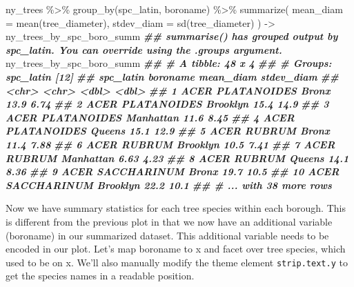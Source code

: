 \documentclass[
]{krantz}
\newenvironment{Shaded}{\begin{snugshade}}{\end{snugshade}}
\newcommand{\AttributeTok}[1]{\textcolor[rgb]{0.77,0.63,0.00}{#1}}
\newcommand{\DocumentationTok}[1]{\textcolor[rgb]{0.56,0.35,0.01}{\textbf{\textit{#1}}}}
\newcommand{\FunctionTok}[1]{\textcolor[rgb]{0.00,0.00,0.00}{#1}}
\newcommand{\NormalTok}[1]{#1}
\newcommand{\OtherTok}[1]{\textcolor[rgb]{0.56,0.35,0.01}{#1}}
\newcommand{\SpecialCharTok}[1]{\textcolor[rgb]{0.00,0.00,0.00}{#1}}
\begin{document}
\begin{Shaded}
\begin{Highlighting}[]
\NormalTok{ny\_trees }\SpecialCharTok{\%\textgreater{}\%}
  \FunctionTok{group\_by}\NormalTok{(spc\_latin, boroname) }\SpecialCharTok{\%\textgreater{}\%}
  \FunctionTok{summarize}\NormalTok{(}
    \AttributeTok{mean\_diam =} \FunctionTok{mean}\NormalTok{(tree\_diameter),}
    \AttributeTok{stdev\_diam =} \FunctionTok{sd}\NormalTok{(tree\_diameter)}
\NormalTok{  ) }\OtherTok{{-}\textgreater{}}\NormalTok{ ny\_trees\_by\_spc\_boro\_summ}
\DocumentationTok{\#\# \textasciigrave{}summarise()\textasciigrave{} has grouped output by \textquotesingle{}spc\_latin\textquotesingle{}. You can override using the \textasciigrave{}.groups\textasciigrave{} argument.}
\NormalTok{ny\_trees\_by\_spc\_boro\_summ}
\DocumentationTok{\#\# \# A tibble: 48 x 4}
\DocumentationTok{\#\# \# Groups:   spc\_latin [12]}
\DocumentationTok{\#\#    spc\_latin        boroname  mean\_diam stdev\_diam}
\DocumentationTok{\#\#    \textless{}chr\textgreater{}            \textless{}chr\textgreater{}         \textless{}dbl\textgreater{}      \textless{}dbl\textgreater{}}
\DocumentationTok{\#\#  1 ACER PLATANOIDES Bronx         13.9        6.74}
\DocumentationTok{\#\#  2 ACER PLATANOIDES Brooklyn      15.4       14.9 }
\DocumentationTok{\#\#  3 ACER PLATANOIDES Manhattan     11.6        8.45}
\DocumentationTok{\#\#  4 ACER PLATANOIDES Queens        15.1       12.9 }
\DocumentationTok{\#\#  5 ACER RUBRUM      Bronx         11.4        7.88}
\DocumentationTok{\#\#  6 ACER RUBRUM      Brooklyn      10.5        7.41}
\DocumentationTok{\#\#  7 ACER RUBRUM      Manhattan      6.63       4.23}
\DocumentationTok{\#\#  8 ACER RUBRUM      Queens        14.1        8.36}
\DocumentationTok{\#\#  9 ACER SACCHARINUM Bronx         19.7       10.5 }
\DocumentationTok{\#\# 10 ACER SACCHARINUM Brooklyn      22.2       10.1 }
\DocumentationTok{\#\# \# ... with 38 more rows}
\end{Highlighting}
\end{Shaded}

Now we have summary statistics for each tree species within each borough. This is different from the previous plot in that we now have an additional variable (boroname) in our summarized dataset. This additional variable needs to be encoded in our plot. Let's map boroname to x and facet over tree species, which used to be on x. We'll also manually modify the theme element \texttt{strip.text.y} to get the species names in a readable position.
\end{document}
